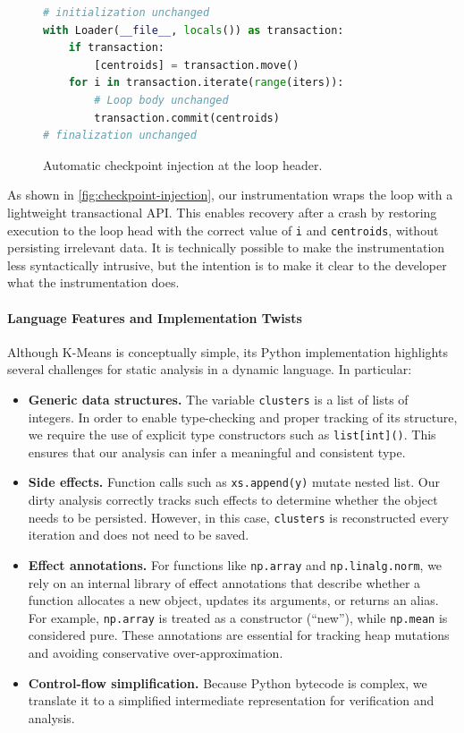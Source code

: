 \begin{figure}[t]
\centering
\begin{lstlisting}[language=python]
# initialization unchanged
with Loader(__file__, locals()) as transaction:
    if transaction:
        [centroids] = transaction.move()
    for i in transaction.iterate(range(iters)):
        # Loop body unchanged
        transaction.commit(centroids)
# finalization unchanged
\end{lstlisting}
\caption{Automatic checkpoint injection at the loop header.}
\label{fig:checkpoint-injection}
\end{figure}

As shown in \autoref{fig:checkpoint-injection}, our instrumentation wraps the loop with a lightweight transactional API. This enables recovery after a crash by restoring execution to the loop head with the correct value of \texttt{i} and \texttt{centroids}, without persisting irrelevant data. It is technically possible to make the instrumentation less syntactically intrusive, but the intention is to make it clear to the developer what the instrumentation does.

\paragraph{Language Features and Implementation Twists}

Although K-Means is conceptually simple, its Python implementation highlights several challenges for static analysis in a dynamic language. In particular:
\begin{itemize}
    \item \textbf{Generic data structures.} The variable \texttt{clusters} is a list of lists of integers. In order to enable type-checking and proper tracking of its structure, we require the use of explicit type constructors such as \texttt{list[int]()}. This ensures that our analysis can infer a meaningful and consistent type.
    \item \textbf{Side effects.} Function calls such as \texttt{xs.append(y)} mutate nested list. Our dirty analysis correctly tracks such effects to determine whether the object needs to be persisted. However, in this case, \texttt{clusters} is reconstructed every iteration and does not need to be saved.
    \item \textbf{Effect annotations.} For functions like \texttt{np.array} and \texttt{np.linalg.norm}, we rely on an internal library of effect annotations that describe whether a function allocates a new object, updates its arguments, or returns an alias. For example, \texttt{np.array} is treated as a constructor (``new''), while \texttt{np.mean} is considered pure. These annotations are essential for tracking heap mutations and avoiding conservative over-approximation.
    \item \textbf{Control-flow simplification.} Because Python bytecode is complex, we translate it to a simplified intermediate representation for verification and analysis.
\end{itemize}

